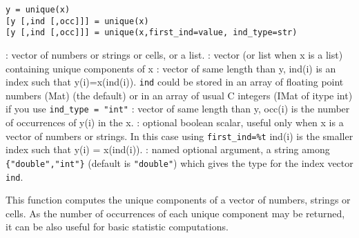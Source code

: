 
\begin{mandesc}
\end{mandesc}

\begin{calling_sequence}
\begin{verbatim}
y = unique(x)
[y [,ind [,occ]]] = unique(x)
[y [,ind [,occ]]] = unique(x,first_ind=value, ind_type=str)
\end{verbatim}
\end{calling_sequence}
\begin{parameters}
  \begin{varlist}
    : vector of numbers or strings or cells, or a list.
    : vector (or list when x is a list) containing unique components of x
    : vector of same length than y, ind(i) is an index
                 such that y(i)=x(ind(i)). \verb+ind+ could be stored in an array of
                 floating point numbers (Mat) (the default) or in an array of 
                 usual C integers (IMat of itype int) if you use \verb+ind_type = "int"+
    : vector of same length than y, occ(i) is the number
                  of occurrences of y(i) in the x.
    : optional boolean scalar, useful only when x is a vector
    of numbers or strings. In this case using \verb!first_ind=%t! ind(i) is
    the smaller index such that y(i) = x(ind(i)).
    : named optional argument, a string among \verb+{"double","int"}+ (default is \verb+"double"+)
    which gives the type for the index vector  \verb+ind+. 
  \end{varlist}
\end{parameters}

\begin{mandescription}
  This function computes the unique components of a vector of numbers,
  strings or cells. As the number of occurrences of each unique
  component may be returned, it can be also useful for basic statistic
  computations.


\end{mandescription}

